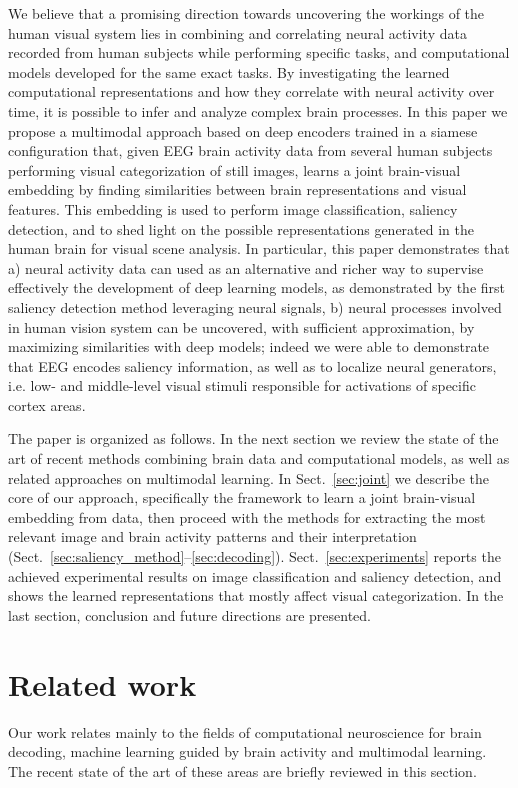 \documentclass[10pt,journal,compsoc,twocolumn]{IEEEtran}
\begin{document}
We believe that a promising direction towards uncovering the workings of the human visual system lies in combining and correlating neural activity data recorded from human subjects while performing specific tasks, and computational models developed for the same exact tasks. By investigating the learned computational representations and how they correlate with neural activity over time, it is possible to infer and analyze complex brain processes.
In this paper we propose a multimodal approach based on deep encoders trained in a siamese configuration that, given EEG brain activity data from several human subjects performing visual categorization of still images, learns a joint brain-visual embedding by finding similarities between brain representations and visual features.
This embedding is used to perform image classification, saliency detection, and to shed light on the possible representations generated in the human brain for visual scene analysis. In particular, this paper demonstrates that a) neural activity data can used  as an alternative and richer way to supervise effectively the development of deep learning models, as demonstrated by the first saliency detection method leveraging neural signals, b) neural processes involved in human vision system can be uncovered, with sufficient approximation, by maximizing similarities with deep models; indeed we were able to demonstrate that EEG encodes saliency information, as well as to localize neural generators, i.e. low- and middle-level visual stimuli responsible for activations of specific cortex areas.

The paper is organized as follows. In the next section we review the state of the art of recent methods combining brain data and computational models, as well as related approaches on multimodal learning. In Sect.~\ref{sec:joint} we describe the core of our approach, specifically the framework to learn a joint brain-visual embedding from data, then proceed with the methods for extracting the most relevant image and brain activity patterns and their interpretation (Sect.~\ref{sec:saliency_method}--\ref{sec:decoding}). Sect.~\ref{sec:experiments} reports the achieved experimental results on image classification and saliency detection, and shows the learned representations that mostly affect visual categorization. In the last section, conclusion and future directions are presented.



\section{Related work}\label{sec:related}
Our work relates mainly to the fields of computational neuroscience for brain decoding, machine learning guided by brain activity and multimodal learning. The recent state of the art of these areas are briefly reviewed in this section. \\
\end{document}
